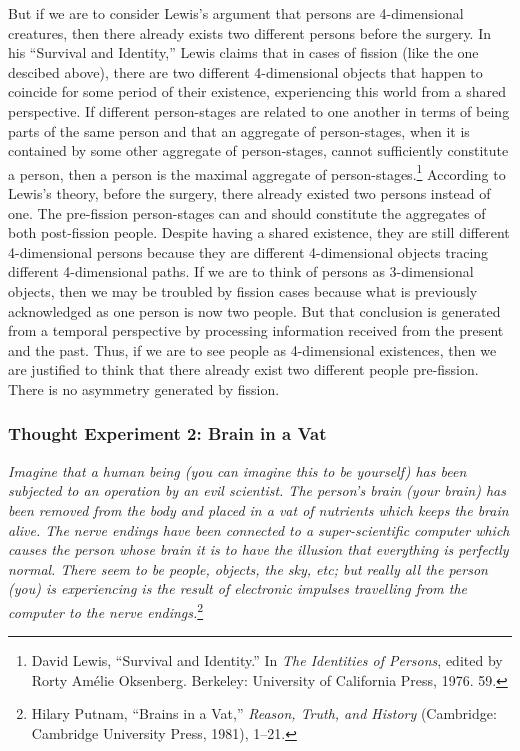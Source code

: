 But if we are to consider Lewis's argument that persons are 4-dimensional creatures, then there already exists two different persons
before the surgery. In his ``Survival and Identity,'' Lewis claims that
in cases of fission (like the one descibed above), there are two
different 4-dimensional objects that happen to coincide for some
period of their existence, experiencing this world from a shared
perspective. If different person-stages are related to one another in
terms of being parts of the same person and that an aggregate of
person-stages, when it is contained by some other aggregate of
person-stages, cannot sufficiently constitute a person, then a person is
the maximal aggregate of person-stages.\footnote{David Lewis, ``Survival
  and Identity.'' In \emph{The Identities of Persons}, edited by Rorty
  Amélie Oksenberg. Berkeley: University of California Press, 1976. 59.} According
to Lewis's theory, before the surgery, there already existed two persons
instead of one. The pre-fission person-stages can and should constitute
the aggregates of both post-fission people. Despite having a shared
existence, they are still different 4-dimensional persons because they
are different 4-dimensional objects tracing different 4-dimensional
paths. If we are to think of persons as 3-dimensional objects, then
we may be troubled by fission cases because what is previously
acknowledged as one person is now two people. But that conclusion is
generated from a temporal perspective by processing information received
from the present and the past. Thus, if we are to see people as 4-dimensional existences, then we are justified to think that there
already exist two different people pre-fission. There is no asymmetry
generated by fission.


\subsubsection*{Thought Experiment 2: Brain in a Vat} \emph{Imagine that a human being (you
can imagine this to be yourself) has been subjected to an operation by
an evil scientist. The person's brain (your brain) has been removed from
the body and placed in a vat of nutrients which keeps the brain alive.
The nerve endings have been connected to a super-scientific computer
which causes the person whose brain it is to have the illusion that
everything is perfectly normal. There seem to be people, objects, the
sky, etc; but really all the person (you) is experiencing is the result
of electronic impulses travelling from the computer to the nerve
endings.}\footnote{Hilary Putnam, ``Brains in a Vat,'' \emph{Reason,
  Truth, and History} (Cambridge: Cambridge University Press, 1981),
  1--21.}
\vspace{1em}


